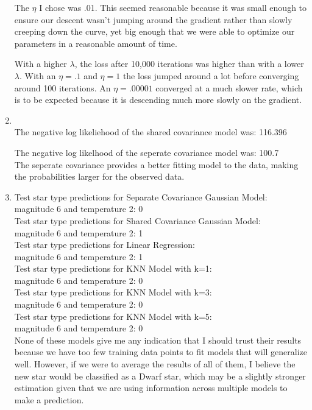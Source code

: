 \documentclass[submit]{harvardml}
\begin{document}
\begin{enumerate}
    The $\eta$ I chose was .01. This seemed reasonable because it was small enough to ensure our descent wasn't jumping around the gradient rather than slowly creeping down the curve, yet big enough that we were able to optimize our parameters in a reasonable amount of time.
    
    With a higher $\lambda$, the loss after 10,000 iterations was higher than with a lower $\lambda$. With an $\eta = .1$ and $\eta=1$ the loss jumped around a lot before converging around 100 iterations. An $\eta = .00001$ converged at a much slower rate, which is to be expected because it is descending much more slowly on the gradient. \\
    
    \item \\ The negative log likeliehood of the shared covariance model was: 116.396
    
    The negative log likelhood of the seperate covariance model was: 100.7 \\
    
    The seperate covariance provides a better fitting model to the data, making the probabilities larger for the observed data.
    
    \item Test star type predictions for Separate Covariance Gaussian Model:\\
magnitude 6 and temperature 2: 0\\

Test star type predictions for Shared Covariance Gaussian Model:\\
magnitude 6 and temperature 2: 1\\

Test star type predictions for Linear Regression:\\
magnitude 6 and temperature 2: 1\\

Test star type predictions for KNN Model with k=1:\\
magnitude 6 and temperature 2: 0\\

Test star type predictions for KNN Model with k=3:\\
magnitude 6 and temperature 2: 0\\

Test star type predictions for KNN Model with k=5:\\
magnitude 6 and temperature 2: 0\\

None of these models give me any indication that I should trust their results because we have too few training data points to fit models that will generalize well. However, if we were to average the results of all of them, I believe the new star would be classified as a Dwarf star, which may be a slightly stronger estimation given that we are using information across multiple models to make a prediction. 

\end{enumerate}
\newpage
\end{document}

